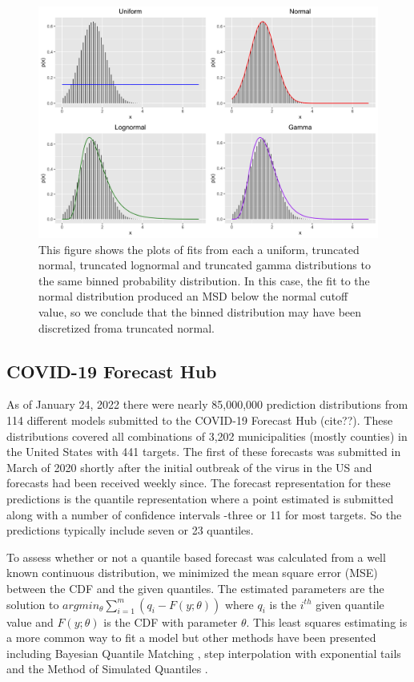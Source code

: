 \documentclass[11pt,notitlepage]{isuthesis}
\begin{document}
\begin{figure}[htbp]
\centerline{\includegraphics[scale=.15]{Images/flu_fit_17_10_3.png}}
\caption[Parametric distribution fits to binned distribution]{This figure shows
the plots of fits from each a uniform, truncated normal, truncated lognormal
and truncated gamma distributions to the same binned probability distribution.
In this case, the fit to the normal distribution produced an MSD below the 
normal cutoff value, so we conclude that the binned distribution may have been
discretized froma truncated normal.}
\label{fig:binparamfits}
\end{figure}



\subsection{COVID-19 Forecast Hub}

As of January 24, 2022 there were nearly 85,000,000 prediction distributions 
from 114 different models submitted to the COVID-19 Forecast Hub (cite??). These 
distributions covered all combinations of 3,202 municipalities (mostly counties) 
in the United States with 441 targets. The first of these forecasts was 
submitted in March of 2020 shortly after the initial outbreak of the virus in 
the US and forecasts had been received weekly since. The forecast representation
for these predictions is the quantile representation where a point estimated is
submitted along with a number of confidence intervals -three or 11 for most
targets. So the predictions typically include seven or 23 quantiles.

To assess whether or not a quantile based forecast was calculated from a well
known continuous distribution, we minimized the mean square error (MSE) between 
the CDF and the given quantiles. The estimated parameters are the 
solution to $argmin_{\theta} \sum_{i=1}^m (q_i - F(y; \theta))$ where $q_i$ is
the $i^{th}$ given quantile value and $F(y; \theta)$ is the CDF with parameter
$\theta$. This least squares estimating is a more common way to fit a model but
other methods have been presented including Bayesian Quantile Matching
\cite{nirwan2020bayesian}, step interpolation with exponential tails 
\cite{quinonero2005evaluating}
and the Method of Simulated Quantiles 
\cite{dominicy2013method}.
\end{document}
